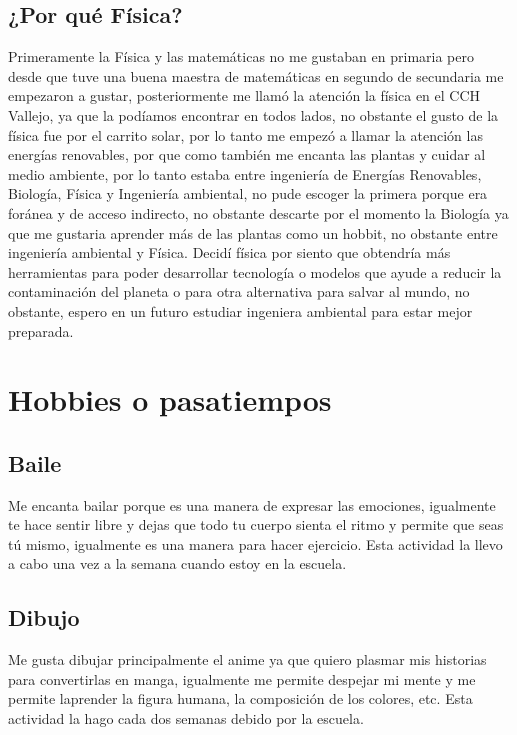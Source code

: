 \documentclass[letterpaper,12pt]{article}
\begin{document}
   \subsection{\Large {¿Por qué Física?}}
 {\scriptsize Primeramente la Física y las matemáticas no me gustaban en primaria pero desde que tuve una buena maestra de matemáticas en segundo de secundaria me empezaron a gustar, posteriormente me llamó la atención la física en el CCH Vallejo, ya que la podíamos encontrar en todos lados, no obstante {\Large el gusto de la física fue por el  carrito solar}, por lo tanto {\Large me empezó a llamar la atención las energías renovables}, por que como también {\Large me encanta las plantas y cuidar al medio ambiente}, por lo tanto estaba entre {\Large ingeniería de Energías Renovables, Biología, Física y Ingeniería ambiental}, no pude escoger la primera porque era  foránea y de  acceso indirecto, no obstante descarte por el momento la Biología ya que me  gustaria aprender más de las plantas como un hobbit, no obstante entre ingeniería ambiental y Física. {\Large Decidí física por siento que obtendría más herramientas para poder desarrollar tecnología o modelos que ayude a reducir la contaminación del planeta o para otra alternativa para salvar al mundo}, no obstante, espero en un futuro estudiar ingeniera ambiental para estar mejor preparada.}  
\section{\Huge {Hobbies o pasatiempos}}
 \subsection{\Large {Baile}}
 {\footnotesize Me encanta bailar porque es una manera de {\LARGE expresar las emociones}, igualmente te hace {\LARGE sentir libre} y dejas que {\LARGE todo tu cuerpo sienta el ritmo} y permite que {\LARGE seas tú mismo}, igualmente es una manera para hacer {\LARGE ejercicio}. Esta actividad la llevo a cabo {\LARGE una vez a la semana} cuando estoy en la {\LARGE escuela.}}
  \subsection{\Large {Dibujo}}
  {\tiny Me gusta dibujar principalmente el {\small anime} ya que quiero {\small plasmar mis historias} para convertirlas en manga, igualmente me permite {\small despejar mi mente} y me permite {\small laprender la figura humana, la composición de los colores}, etc. Esta actividad la hago {\small cada dos semanas} debido por la escuela.}
\end{document}
